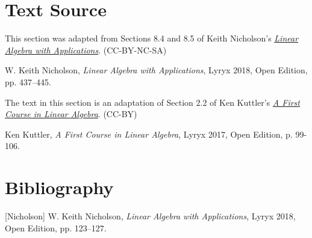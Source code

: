\documentclass{ximera}
\begin{document}
    
\section*{Text Source} This section was adapted from Sections 8.4 and 8.5 of Keith Nicholson's \href{https://open.umn.edu/opentextbooks/textbooks/linear-algebra-with-applications}{\it Linear Algebra with Applications}. (CC-BY-NC-SA)
    
W. Keith Nicholson, {\it Linear Algebra with Applications}, Lyryx 2018, Open Edition, pp. 437--445.

 
The text in this section is an adaptation of Section 2.2 of Ken Kuttler's \href{https://open.umn.edu/opentextbooks/textbooks/a-first-course-in-linear-algebra-2017}{\it A First Course in Linear Algebra}. (CC-BY)
 
Ken Kuttler, {\it  A First Course in Linear Algebra}, Lyryx 2017, Open Edition, p. 99-106.
 
\section*{Bibliography}
 
[Nicholson] W. Keith Nicholson, {\it Linear Algebra with Applications}, Lyryx 2018, Open Edition, pp. 123--127.
\end{document}
